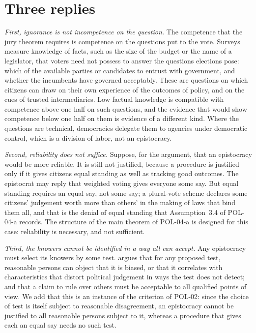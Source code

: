 \documentclass{situationist-preprint}
\begin{document}
\section{Three replies}

\emph{First, ignorance is not incompetence on the question.} The competence that the jury theorem requires is competence on the questions put to the vote. Surveys measure knowledge of facts, such as the size of the budget or the name of a legislator, that voters need not possess to answer the questions elections pose: which of the available parties or candidates to entrust with government, and whether the incumbents have governed acceptably. These are questions on which citizens can draw on their own experience of the outcomes of policy, and on the cues of trusted intermediaries. Low factual knowledge is compatible with competence above one half on such questions, and the evidence that would show competence below one half on them is evidence of a different kind. Where the questions are technical, democracies delegate them to agencies under democratic control, which is a division of labor, not an epistocracy.

\emph{Second, reliability does not suffice.} Suppose, for the argument, that an epistocracy would be more reliable. It is still not justified, because a procedure is justified only if it gives citizens equal standing as well as tracking good outcomes. The epistocrat may reply that weighted voting gives everyone some say. But equal standing requires an equal say, not some say; a plural-vote scheme declares some citizens' judgement worth more than others' in the making of laws that bind them all, and that is the denial of equal standing that Assumption~3.4 of POL-04-a records. The structure of the main theorem of POL-04-a is designed for this case: reliability is necessary, and not sufficient.

\emph{Third, the knowers cannot be identified in a way all can accept.} Any epistocracy must select its knowers by some test. \citet{Estlund2008} argues that for any proposed test, reasonable persons can object that it is biased, or that it correlates with characteristics that distort political judgement in ways the test does not detect; and that a claim to rule over others must be acceptable to all qualified points of view. We add that this is an instance of the criterion of POL-02: since the choice of test is itself subject to reasonable disagreement, an epistocracy cannot be justified to all reasonable persons subject to it, whereas a procedure that gives each an equal say needs no such test.
\end{document}
